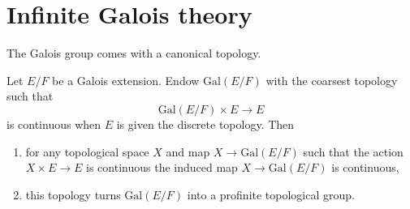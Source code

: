 \section{Infinite Galois theory}
\label{section-infinite-galois}

\noindent
The Galois group comes with a canonical topology.

\begin{lemma}
\label{lemma-galois-profinite}
Let $E/F$ be a Galois extension. Endow $\text{Gal}(E/F)$ with the coarsest
topology such that
$$
\text{Gal}(E/F) \times E \longrightarrow E
$$
is continuous when $E$ is given the discrete topology. Then
\begin{enumerate}
\item for any topological space $X$ and map $X \to \text{Gal}(E/F)$
such that the action $X \times E \to E$ is continuous the induced map
$X \to \text{Gal}(E/F)$ is continuous,
\item this topology turns $\text{Gal}(E/F)$ into
a profinite topological group.
\end{enumerate}
\end{lemma}

